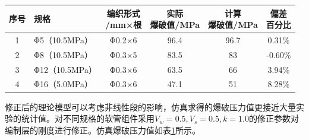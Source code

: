 \begin{table}[!htb]
	\centering
	\label{tab:strength-of-hose}
	\begin{tabular}{@{\extracolsep{\fill}}>{\hspace{0.5cm}}clcccc}
		\toprule
		序号 &    规格     & \tabincell{c}{编织形式\\/mm×根 }& \tabincell{c}{实际\\爆破值/MPa }& \tabincell{c}{计算\\爆破值/MPa}& \tabincell{c}{偏差\\百分比}  \\ \midrule
		1  & Φ5（10.5MPa）  & Φ0.2×6  &   96.4    & 96.7          & 0.31\% \\
		2  & Φ8（10.5MPa）  & Φ0.3×5  &   83.5    & 83          & -0.60\% \\
		3  & Φ12（10.5MPa） & Φ0.3×6  &   63.5    & 66          & 3.94\%  \\
		4  & Φ16（5.0MPa）  & Φ0.3×6  &   47.1    & 51          & 8.28\% \\ \bottomrule
	\end{tabular} 
	\end{table}  

修正后的理论模型可以考虑非线性段的影响，仿真求得的爆破压力值更接近大量实验的统计值。对不同规格的软管组件采用$ V_w=0.5,V_s=0.5,k=1.0 $的修正参数对编制层的刚度进行修正。仿真爆破压力值如表\ref{tab:strength-of-hose}所示。

